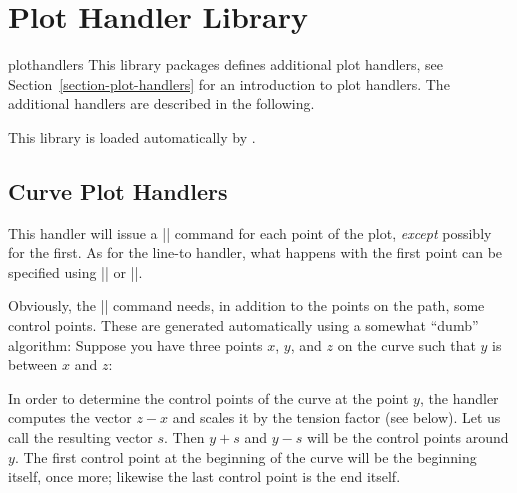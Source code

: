 %
%
%


\section[library-plot-handlers]{Plot Handler Library}
\label{section-library-plothandlers}

\begin{pgflibrary}{plothandlers}
    This library packages defines additional plot handlers, see
    Section~\ref{section-plot-handlers} for an introduction to plot handlers.
    The additional handlers are described in the following.

    This library is loaded automatically by \tikzname.
\end{pgflibrary}


\subsection{Curve Plot Handlers}

\begin{command}{\pgfplothandlercurveto}
    This handler will issue a |\pgfpathcurveto| command for each point of the
    plot, \emph{except} possibly for the first. As for the line-to handler,
    what happens with the first point can be specified using
    |\pgfsetmovetofirstplotpoint| or |\pgfsetlinetofirstplotpoint|.

    Obviously, the |\pgfpathcurveto| command needs, in addition to the points
    on the path, some control points. These are generated automatically using a
    somewhat ``dumb'' algorithm: Suppose you have three points $x$, $y$, and
    $z$ on the curve such that $y$ is between $x$ and $z$:
\begin{codeexample}[]
\end{codeexample}

    In order to determine the control points of the curve at the point $y$, the
    handler computes the vector $z-x$ and scales it by the tension factor (see
    below). Let us call the resulting vector $s$. Then $y+s$ and $y-s$ will be
    the control points around $y$. The first control point at the beginning of
    the curve will be the beginning itself, once more; likewise the last
    control point is the end itself.
\end{command}

